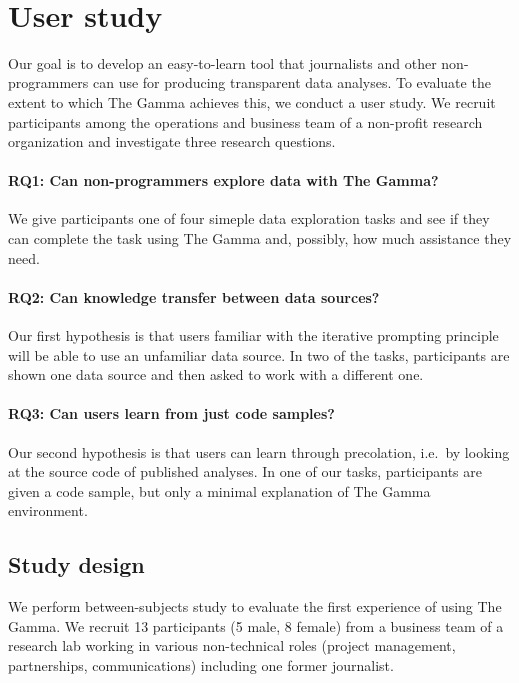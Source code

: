 \documentclass{sigchi}
\begin{document}
\newpage
~
\newpage


\section{User study}
\label{sec:study}

Our goal is to develop an easy-to-learn tool that journalists and other non-programmers can use
for producing transparent data analyses. To evaluate the extent to which The Gamma achieves this,
we conduct a user study. We recruit participants among the operations and business team of a
non-profit research organization and investigate three research questions.

\paragraph{RQ1: Can non-programmers explore data with The Gamma?}
We give participants one of four simeple data exploration tasks and see if they can complete the
task using The Gamma and, possibly, how much assistance they need.

\paragraph{RQ2: Can knowledge transfer between data sources?}
Our first hypothesis is that users familiar with the iterative prompting principle will be able to
use an unfamiliar data source. In two of the tasks, participants are shown one data source and
then asked to work with a different one.

\paragraph{RQ3: Can users learn from just code samples?}
Our second hypothesis is that users can learn through precolation, i.e.~by looking at the source
code of published analyses. In one of our tasks, participants are given a code sample, but only a
minimal explanation of The Gamma environment.

\subsection{Study design}
We perform between-subjects study to evaluate the first experience of using The Gamma.
We recruit 13 participants (5 male, 8 female) from a business team
of a research lab working in various non-technical roles (project management,
partnerships, communications) including one former journalist.
\end{document}
